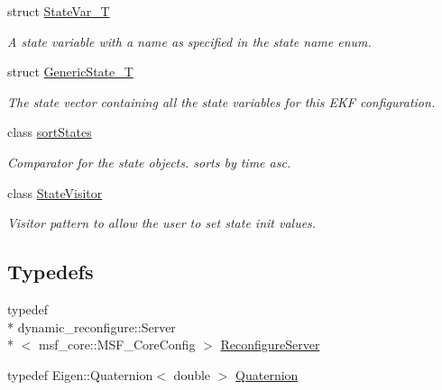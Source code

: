 \begin{DoxyCompactItemize}
struct \hyperlink{structmsf__core_1_1StateVar__T}{State\-Var\-\_\-\-T}
\begin{DoxyCompactList}\small\item\em A state variable with a name as specified in the state name enum. \end{DoxyCompactList}\item 
struct \hyperlink{structmsf__core_1_1GenericState__T}{Generic\-State\-\_\-\-T}
\begin{DoxyCompactList}\small\item\em The state vector containing all the state variables for this E\-K\-F configuration. \end{DoxyCompactList}\item 
class \hyperlink{classmsf__core_1_1sortStates}{sort\-States}
\begin{DoxyCompactList}\small\item\em Comparator for the state objects. sorts by time asc. \end{DoxyCompactList}\item 
class \hyperlink{classmsf__core_1_1StateVisitor}{State\-Visitor}
\begin{DoxyCompactList}\small\item\em Visitor pattern to allow the user to set state init values. \end{DoxyCompactList}\end{DoxyCompactItemize}
\subsection*{Typedefs}
\begin{DoxyCompactItemize}
\item 
typedef \\*
dynamic\-\_\-reconfigure\-::\-Server\\*
$<$ msf\-\_\-core\-::\-M\-S\-F\-\_\-\-Core\-Config $>$ \hyperlink{namespacemsf__core_a1f60c4e359e82d9ad14dd135769ccc1a}{Reconfigure\-Server}
\item 
typedef Eigen\-::\-Quaternion$<$ double $>$ \hyperlink{namespacemsf__core_a044c525dd7800e2e2f4bb86fc565a7c7}{Quaternion}
\end{DoxyCompactItemize}
